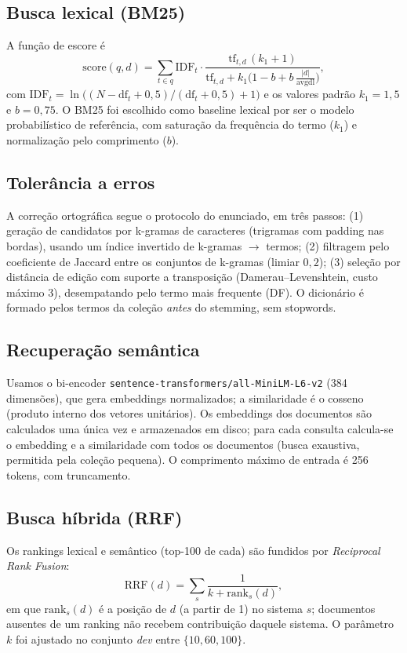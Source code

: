 \documentclass[9pt,a4paper,twocolumn]{article}
\newcommand{\bmk}{\textsc{BM25}}
\newcommand{\rrf}{\textsc{RRF}}
\begin{document}
\subsection{Busca lexical (\bmk{})}
A função de escore é
\[
\mathrm{score}(q,d)=\sum_{t\in q} \mathrm{IDF}_t \cdot
\frac{\mathrm{tf}_{t,d}\,(k_1+1)}{\mathrm{tf}_{t,d}+k_1\big(1-b+b\,\tfrac{|d|}{\mathrm{avgdl}}\big)},
\]
com $\mathrm{IDF}_t=\ln\!\big((N-\mathrm{df}_t+0{,}5)/(\mathrm{df}_t+0{,}5)+1\big)$ e os valores
padrão $k_1=1{,}5$ e $b=0{,}75$. O \bmk{} foi escolhido como baseline lexical por ser o modelo
probabilístico de referência, com saturação da frequência do termo ($k_1$) e normalização pelo
comprimento ($b$).

\subsection{Tolerância a erros}
A correção ortográfica segue o protocolo do enunciado, em três passos: (1) geração de candidatos
por k-gramas de caracteres (trigramas com padding nas bordas), usando um índice invertido de
k-gramas $\rightarrow$ termos; (2) filtragem pelo coeficiente de Jaccard entre os conjuntos de
k-gramas (limiar $0{,}2$); (3) seleção por distância de edição com suporte a transposição
(Damerau--Levenshtein, custo máximo $3$), desempatando pelo termo mais frequente (DF). O
dicionário é formado pelos termos da coleção \emph{antes} do stemming, sem stopwords.

\subsection{Recuperação semântica}
Usamos o bi-encoder \texttt{sentence-transformers/all-MiniLM-L6-v2} (384 dimensões), que gera
embeddings normalizados; a similaridade é o cosseno (produto interno dos vetores unitários). Os
embeddings dos documentos são calculados uma única vez e armazenados em disco; para cada consulta
calcula-se o embedding e a similaridade com todos os documentos (busca exaustiva, permitida pela
coleção pequena). O comprimento máximo de entrada é 256 tokens, com truncamento.

\subsection{Busca híbrida (\rrf{})}
Os rankings lexical e semântico (top-100 de cada) são fundidos por \textit{Reciprocal Rank Fusion}:
\[
\mathrm{RRF}(d)=\sum_{s}\frac{1}{k+\mathrm{rank}_s(d)},
\]
em que $\mathrm{rank}_s(d)$ é a posição de $d$ (a partir de 1) no sistema $s$; documentos ausentes
de um ranking não recebem contribuição daquele sistema. O parâmetro $k$ foi ajustado no conjunto
\emph{dev} entre $\{10,60,100\}$.
\end{document}
